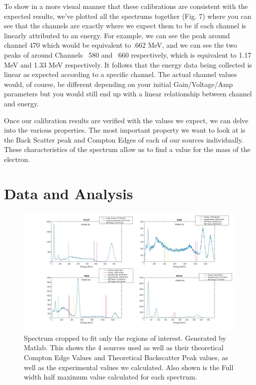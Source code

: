\documentclass[%
 reprint,
 amsmath,amssymb,
 aps,
]{revtex4-1}
\begin{document}
To show in a more visual manner that these calibrations are consistent with the expected results, we've plotted all the spectrums together (Fig. 7) where you can see that the channels are exactly where we expect them to be if each channel is linearly attributed to an energy. For example, we can see the \cs peak around channel 470 which would be equivalent to .662 MeV, and we can see the two peaks of \co around  Channels ~580 and ~660 respectively, which is equivalent to 1.17 MeV and 1.33 MeV respectively. It follows that the energy data being collected is linear as expected according to a specific channel. The actual channel values would, of course, be different depending on your initial Gain/Voltage/Amp parameters but you would still end up with a linear relationship between channel and energy.

Once our calibration results are verified with the values we expect, we can delve into the various properties. The most important property we want to look at is the Back Scatter peak and Compton Edges of each of our sources individually. These characteristics of the spectrum allow us to find a value for the mass of the electron.

\newpage
\section{\label{sec:level1}Data and Analysis}
\begin{figure}
\includegraphics[width = \textwidth ,frame]{ce.jpg}
\caption{  Spectrum cropped to fit only the regions of interest. Generated by Matlab. This shows the 4 sources used as well as their theoretical Compton Edge Values and Theoretical Backscatter Peak values, as well as the experimental values we calculated. Also shown is the Full width half maximum value calculated for each spectrum.}
\end{figure}
 
\end{document}
